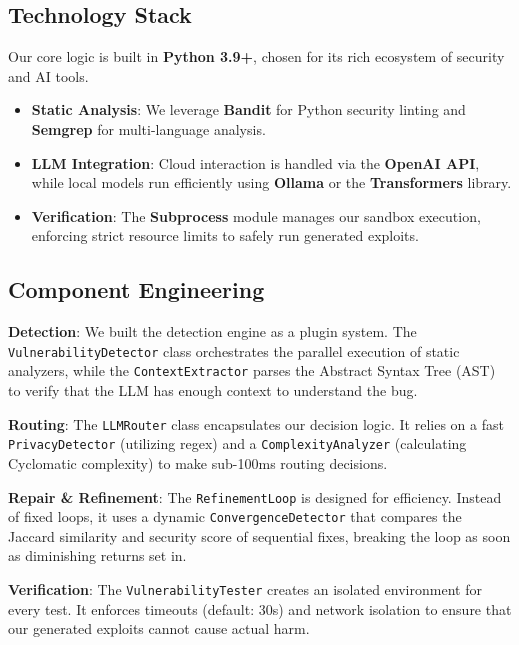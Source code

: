 \documentclass[conference]{IEEEtran}
\begin{document}
\subsection{Technology Stack}
Our core logic is built in \textbf{Python 3.9+}, chosen for its rich ecosystem of security and AI tools.
\begin{itemize}
\item \textbf{Static Analysis}: We leverage \textbf{Bandit} for Python security linting and \textbf{Semgrep} for multi-language analysis.
\item \textbf{LLM Integration}: Cloud interaction is handled via the \textbf{OpenAI API}, while local models run efficiently using \textbf{Ollama} or the \textbf{Transformers} library.
\item \textbf{Verification}: The \textbf{Subprocess} module manages our sandbox execution, enforcing strict resource limits to safely run generated exploits.
\end{itemize}

\subsection{Component Engineering}
\textbf{Detection}: We built the detection engine as a plugin system. The \texttt{VulnerabilityDetector} class orchestrates the parallel execution of static analyzers, while the \texttt{ContextExtractor} parses the Abstract Syntax Tree (AST) to verify that the LLM has enough context to understand the bug.

\textbf{Routing}: The \texttt{LLMRouter} class encapsulates our decision logic. It relies on a fast \texttt{PrivacyDetector} (utilizing regex) and a \texttt{ComplexityAnalyzer} (calculating Cyclomatic complexity) to make sub-100ms routing decisions.

\textbf{Repair \& Refinement}: The \texttt{RefinementLoop} is designed for efficiency. Instead of fixed loops, it uses a dynamic \texttt{ConvergenceDetector} that compares the Jaccard similarity and security score of sequential fixes, breaking the loop as soon as diminishing returns set in.

\textbf{Verification}: The \texttt{VulnerabilityTester} creates an isolated environment for every test. It enforces timeouts (default: 30s) and network isolation to ensure that our generated exploits cannot cause actual harm.
\end{document}
